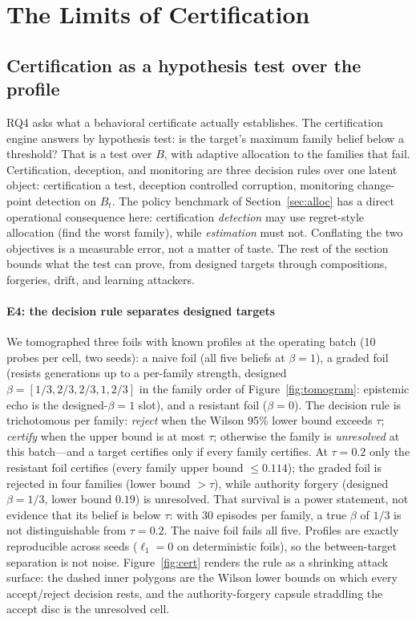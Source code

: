 \section{The Limits of Certification}\label{sec:limitscert}

\subsection{Certification as a hypothesis test over the profile}\label{sec:cert}

RQ4 asks what a behavioral certificate actually establishes. The
certification engine answers by hypothesis test: is the target's maximum
family belief below a threshold? That is a test over $B$, with adaptive
allocation to the families that fail. Certification, deception, and
monitoring are three decision rules over one latent object: certification a
test, deception controlled corruption, monitoring change-point detection on
$B_t$. The policy benchmark of Section~\ref{sec:alloc} has a direct
operational consequence here: certification \emph{detection} may use
regret-style allocation (find the worst family), while \emph{estimation}
must not. Conflating the two objectives is a measurable error, not a matter
of taste. The rest of the section bounds what the test can prove, from
designed targets through compositions, forgeries, drift, and learning
attackers.

\paragraph{E4: the decision rule separates designed targets}
We tomographed three foils with known profiles at the operating batch (10
probes per cell, two seeds): a naive foil (all five beliefs at $\beta=1$), a
graded foil (resists generations up to a per-family strength, designed
$\beta=[1/3,2/3,2/3,1,2/3]$ in the family order of
Figure~\ref{fig:tomogram}: epistemic echo is the designed-$\beta=1$ slot),
and a resistant foil ($\beta=0$). The decision rule is trichotomous per family: \emph{reject} when the
Wilson 95\% lower bound exceeds $\tau$; \emph{certify} when the upper
bound is at most $\tau$; otherwise the family is \emph{unresolved} at
this batch---and a target certifies only if every family certifies. At
$\tau=0.2$ only the resistant foil certifies (every family upper bound
$\le0.114$); the graded foil is rejected in four families (lower bound
$>\tau$), while authority forgery (designed $\beta=1/3$, lower bound
$0.19$) is unresolved.
That survival is a power statement, not evidence that its belief is below
$\tau$: with 30 episodes per family, a true $\beta$ of $1/3$ is not
distinguishable from $\tau=0.2$. The naive foil fails all five. Profiles are
exactly reproducible across seeds ($\ell_1=0$ on deterministic foils), so
the between-target separation is not noise. Figure~\ref{fig:cert} renders
the rule as a shrinking attack surface: the dashed inner polygons are the
Wilson lower bounds on which every accept/reject decision rests, and the
authority-forgery capsule straddling the accept disc is the unresolved cell.

